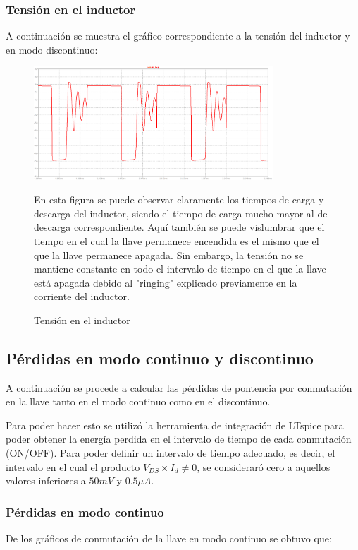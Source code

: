 \documentclass[e4_tp1_main.tex]{subfiles}
\begin{document}
	\subsubsection{Tensión en el inductor}
	A continuación se muestra el gráfico correspondiente a la tensión del inductor y en modo discontinuo:
	\begin{figure}[H]
		\centering
		\includegraphics[width=0.8\textwidth]{images/ej4/fig4.png}
		\caption{Tensión en el inductor}
		\label{fig:my_label}
		
		En esta figura se puede observar claramente los tiempos de carga y descarga del inductor, siendo el tiempo de  carga mucho mayor al de descarga correspondiente. Aquí también se puede vislumbrar que el tiempo en el cual la llave permanece encendida es el mismo que el que la llave permanece apagada. Sin embargo, la tensión no se mantiene constante en todo el intervalo de tiempo en el que la llave está apagada debido al "ringing" explicado previamente en la corriente del inductor.
		
	\end{figure}
	\subsection{Pérdidas en modo continuo y discontinuo}
	A continuación se procede a calcular las pérdidas de pontencia por conmutación en la llave tanto en el modo continuo como en el discontinuo. 
	
	Para poder hacer esto se utilizó la herramienta de integración de LTspice para poder obtener la energía perdida en el intervalo de tiempo de cada conmutación (ON/OFF). Para poder definir un intervalo de tiempo adecuado, es decir, el intervalo en el cual el producto $V_{DS}\times I_d\neq 0$, se consideraró cero a aquellos valores inferiores a $50mV$ y $0.5\mu A$.
	
	\subsubsection{Pérdidas en modo continuo}
	De los gráficos de conmutación de la llave en modo continuo se obtuvo que:
	
\end{document}
